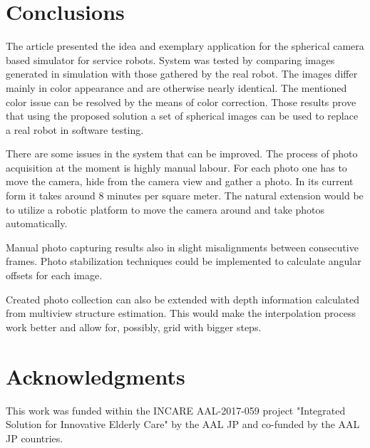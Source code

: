 \documentclass{svproc}
\begin{document}
\section{Conclusions}

The article presented the idea and exemplary application for the spherical camera based 
simulator for service robots. System was tested by comparing images generated in simulation
with those gathered by the real robot. The images differ mainly in color appearance 
and are otherwise nearly identical. The mentioned color issue can be resolved by the 
means of color correction. Those results prove that using the proposed solution a set 
of spherical images can be used to replace a real robot in software testing.

There are some issues in the system that can be improved. The process of photo acquisition
at the moment is highly manual labour. For each photo one has to move the camera, hide from
the camera view and gather a photo. In its current form it takes around 8 minutes per square meter.
The natural extension would be to utilize a robotic platform to move the camera around and
take photos automatically.

Manual photo capturing results also in slight misalignments between consecutive frames.
Photo stabilization techniques could be implemented to calculate angular offsets for each
image.

Created photo collection can also be extended with depth information calculated from multiview
structure estimation. This would make the interpolation process work better and allow for, 
possibly, grid with bigger steps.

\section*{Acknowledgments}
\label{sec:acknowledgments}
This work was funded within the INCARE AAL-2017-059 project "Integrated Solution for Innovative Elderly
Care" by the AAL JP and co-funded by the AAL JP countries.

 

\end{document}
